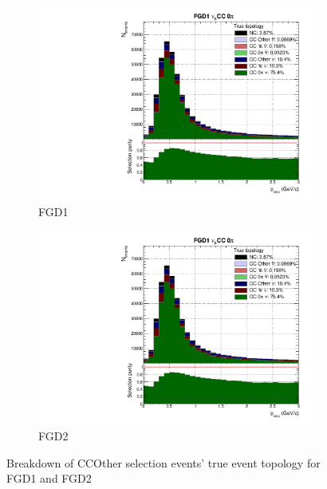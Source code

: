\begin{figure}[h]
	\begin{subfigure}[t]{0.49\textwidth}
		\includegraphics[width=\textwidth,page=17, trim={0mm 0mm 0mm 9mm}, clip]{figures/mach3/2018/Selection/2018_RedNDmatrix_rebin_verbose_may_noweights_diagnostics}
		\caption{FGD1}
	\end{subfigure}
	\begin{subfigure}[t]{0.49\textwidth}
		\includegraphics[width=\textwidth,page=23, trim={0mm 0mm 0mm 9mm}, clip]{figures/mach3/2018/Selection/2018_RedNDmatrix_rebin_verbose_may_noweights_diagnostics}
		\caption{FGD2}
	\end{subfigure}
	\caption{Breakdown of \numubar CCOther selection events' true event topology for FGD1 and FGD2 }
	\label{fig:numubar_ccOth_topology_2018}
\end{figure}

